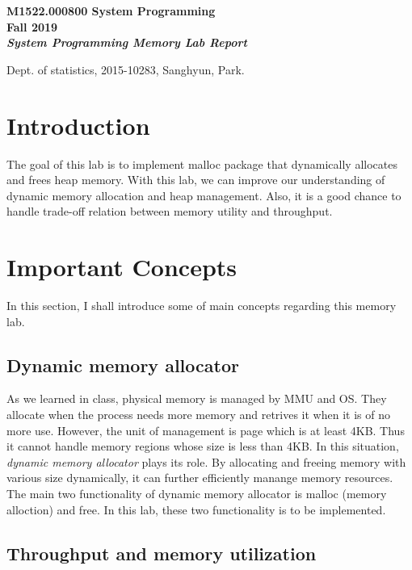 \documentclass[fleqn]{article}
\begin{document}
\begin{center}
    \large\bfseries M1522.000800 System Programming\\
    Fall 2019\\
    \Large\normalfont\bfseries\itshape System Programming Memory Lab Report
\end{center}
\begin{flushright}
    Dept. of statistics, 2015-10283, Sanghyun, Park.
\end{flushright}

\section{Introduction}
The goal of this lab is to implement malloc package that dynamically allocates and frees heap memory. With this lab, we can improve our understanding of dynamic memory allocation and heap management. Also, it is a good chance to handle trade-off relation between memory utility and throughput.

\section{Important Concepts}

In this section, I shall introduce some of main concepts regarding this memory lab.

\subsection{Dynamic memory allocator}

As we learned in class, physical memory is managed by MMU and OS. They allocate when the process needs more memory and retrives it when it is of no more use. However, the unit of management is page which is at least 4KB. Thus it cannot handle memory regions whose size is less than 4KB. In this situation, \textit{dynamic memory allocator} plays its role. By allocating and freeing memory with various size dynamically, it can further efficiently manange memory resources. The main two functionality of dynamic memory allocator is malloc (memory alloction) and free. In this lab, these two functionality is to be implemented.

\subsection{Throughput and memory utilization}
\end{document}
